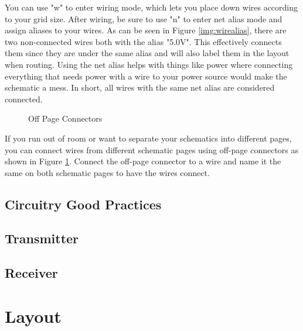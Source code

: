 You can use "w" to enter wiring mode, which lets you place down wires according to your grid size. After wiring, be sure to use
"n" to enter net alias mode and assign aliases to your wires. As can be seen in Figure \ref{img:wirealias}, there are two
non-connected wires both with the alias "5.0V". This effectively connects them since they are under the same alias and will also
label them in the layout when routing. Using the net alias helps with things like power where connecting everything that needs
power with a wire to your power source would make the schematic a mess. In short, all wires with the same net alias are considered
connected.

\begin{figure}[H]
\caption{Off Page Connectors}
\label{img:offpageconn}
\end{figure}

If you run out of room or want to separate your schematics into different pages, you can connect wires from different schematic
pages using off-page connectors as shown in Figure \ref{img:offpageconn}. Connect the off-page connector to a wire and name it
the same on both schematic pages to have the wires connect.

\subsection{Circuitry Good Practices}
\subsection{Transmitter}
\subsection{Receiver}

\section{Layout}
\